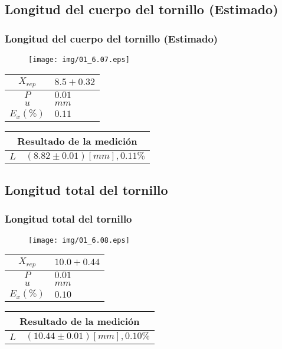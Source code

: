 \documentclass[letter,11pt]{beamer}
\begin{document}
\subsection{Longitud del cuerpo del tornillo (Estimado)}
\begin{frame}
\frametitle{Longitud del cuerpo del tornillo (Estimado)}
\vspace*{0.8cm}
\begin{figure}
\centering
\texttt{[image: img/01\_6.07.eps]}
\end{figure}
\vspace*{0.4cm}
\scriptsize
\begin{tabular}{|c|>{\centering}m{1.8cm}<{\centering}|}
\hline
$X_{rep}$ &  $8.5+0.32$ \tabularnewline \hline
      $P$ &      $0.01$ \tabularnewline \hline
      $u$ &        $mm$ \tabularnewline \hline
$E_x(\%)$ &      $0.11$ \tabularnewline \hline
\end{tabular}
\quad
\begin{tabular}{|c|>{\centering}m{5.7cm}<{\centering}|}
\hline
\multicolumn{2}{|c|}{\textbf{Resultado de la medición}} \\ \hline
$L$ & $( 8.82\pm0.01)[mm], 0.11\%$ \tabularnewline \hline
\end{tabular}
\end{frame}

\subsection{Longitud total del tornillo}
\begin{frame}
\frametitle{Longitud total del tornillo}
\vspace*{0.8cm}
\begin{figure}
\centering
\texttt{[image: img/01\_6.08.eps]}
\end{figure}
\vspace*{0.4cm}
\scriptsize
\begin{tabular}{|c|>{\centering}m{1.8cm}<{\centering}|}
\hline
$X_{rep}$ &  $10.0+0.44$ \tabularnewline \hline
      $P$ &       $0.01$ \tabularnewline \hline
      $u$ &         $mm$ \tabularnewline \hline
$E_x(\%)$ &       $0.10$ \tabularnewline \hline
\end{tabular}
\quad
\begin{tabular}{|c|>{\centering}m{5.7cm}<{\centering}|}
\hline
\multicolumn{2}{|c|}{\textbf{Resultado de la medición}} \\ \hline
$L$ & $(10.44\pm0.01)[mm], 0.10\%$ \tabularnewline \hline
\end{tabular}
\end{frame}
\end{document}
